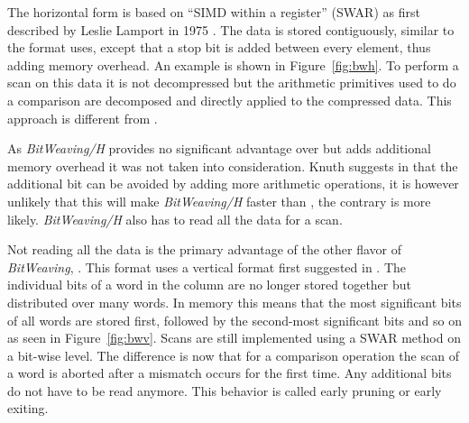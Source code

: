 The horizontal form is based on ``SIMD within a register'' (SWAR) as first
described by Leslie Lamport in 1975 \cite{SWAR}. The data is stored
contiguously, similar to the format \simdscan{} uses, except that a stop bit is
added between every element, thus adding memory overhead. An example is shown in
Figure~\ref{fig:bwh}. To perform a scan on this data it is not decompressed but
the arithmetic primitives used to do a comparison are decomposed and directly
applied to the compressed data. This approach is different from \simdscan{}.

As \emph{BitWeaving/H} provides no significant advantage over \simdscan{} but
adds additional memory overhead it was not taken into consideration. Knuth
suggests in \cite{SWAR} that the additional bit can be avoided by adding more
arithmetic operations, it is however unlikely that this will make
\emph{BitWeaving/H} faster than \simdscan{}, the contrary is more likely.
\emph{BitWeaving/H} also has to read all the data for a scan.

Not reading all the data is the primary advantage of the other flavor of
\emph{BitWeaving}, \bwv{}. This format uses a vertical format first suggested in
\cite{oneill}. The individual bits of a word in the column are no longer stored
together but distributed over many words. In memory this means that the most
significant bits of all words are stored first, followed by the second-most
significant bits and so on as seen in Figure~\ref{fig:bwv}. Scans are still
implemented using a SWAR method on a bit-wise level. The difference is now that
for a comparison operation the scan of a word is aborted after a mismatch occurs
for the first time. Any additional bits do not have to be read anymore. This
behavior is called early pruning or early exiting.

